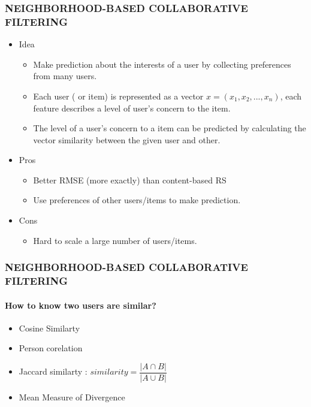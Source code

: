 \documentclass[11pt]{beamer}
\begin{document}
\begin{frame}
\frametitle{\textbf{NEIGHBORHOOD-BASED COLLABORATIVE FILTERING}}
\begin{itemize}
\pause
	\item Idea
	\begin{itemize}
		\item Make prediction about the interests of a user by collecting preferences from many users.
		\item Each user ( or item) is represented as a vector $x = (x_1, x_2,..., x_n)$, each feature describes a level of user's concern to the item.
		\item The level of a user's concern to a item can be predicted by calculating the vector similarity between the given user and other.
	\end{itemize}
	\pause\item Pros 
	\begin{itemize}
		\item Better RMSE (more exactly) than content-based RS
		\item Use preferences of other users/items to make prediction.
	\end{itemize}
	\pause\item Cons
	\begin{itemize}
		\item Hard to scale a large number of users/items.
	\end{itemize}
\end{itemize}
\end{frame}

\begin{frame}
\frametitle{\textbf{NEIGHBORHOOD-BASED COLLABORATIVE FILTERING}}
\framesubtitle{How to know two users are similar?}
\begin{itemize}
	\pause\item Cosine Similarty
	\pause\item Person corelation
	\pause\item Jaccard similarty : $ similarity = \dfrac{|A\cap B|}{|A\cup B|}$
	\pause\item Mean Measure of Divergence
\end{itemize}
\end{frame}
\end{document}
